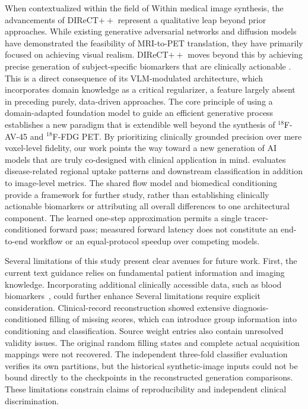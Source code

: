 \documentclass{article}
\providecommand{\DIFaddtex}[1]{{\protect\color{blue} \sf #1}} %
\providecommand{\DIFdeltex}[1]{{\protect\color{red} \scriptsize #1}} %
\providecommand{\DIFaddbegin}{} %
\providecommand{\DIFaddend}{} %
\providecommand{\DIFdelbegin}{} %
\providecommand{\DIFdelend}{} %
\providecommand{\DIFadd}[1]{\texorpdfstring{\DIFaddtex{#1}}{#1}} %
\providecommand{\DIFdel}[1]{\texorpdfstring{\DIFdeltex{#1}}{}} %
\newcommand{\DIFscaledelfig}{0.5}
\newlength{\DIFdelgraphicswidth} %
\newlength{\DIFdelgraphicsheight} %
\newcommand{\DIFaddincludegraphics}[2][]{{\color{blue}\fbox{\DIFOincludegraphics[#1]{#2}}}} %
\newcommand{\DIFdelincludegraphics}[2][]{%
\sbox{\DIFdelgraphicsbox}{\DIFOincludegraphics[#1]{#2}}%
\settoboxwidth{\DIFdelgraphicswidth}{\DIFdelgraphicsbox} %
\settoboxtotalheight{\DIFdelgraphicsheight}{\DIFdelgraphicsbox} %
\scalebox{\DIFscaledelfig}{%
\parbox[b]{\DIFdelgraphicswidth}{\usebox{\DIFdelgraphicsbox}\\[-\baselineskip] \rule{\DIFdelgraphicswidth}{0em}}\llap{\resizebox{\DIFdelgraphicswidth}{\DIFdelgraphicsheight}{%
\setlength{\unitlength}{\DIFdelgraphicswidth}%
\begin{picture}(1,1)%
\thicklines\linethickness{2pt} %
{\color[rgb]{1,0,0}\put(0,0){\framebox(1,1){}}}%
{\color[rgb]{1,0,0}\put(0,0){\line( 1,1){1}}}%
{\color[rgb]{1,0,0}\put(0,1){\line(1,-1){1}}}%
\end{picture}%
}\hspace*{3pt}}} %
} %
\DeclareRobustCommand{\DIFaddbegin}{\DIFOaddbegin \let\includegraphics\DIFaddincludegraphics} %
\DeclareRobustCommand{\DIFaddend}{\DIFOaddend \let\includegraphics\DIFOincludegraphics} %
\DeclareRobustCommand{\DIFdelbegin}{\DIFOdelbegin \let\includegraphics\DIFdelincludegraphics} %
\DeclareRobustCommand{\DIFdelend}{\DIFOaddend \let\includegraphics\DIFOincludegraphics} %
\begin{document}
\DIFdelbegin \DIFdel{When contextualized within the field of }\DIFdelend \DIFaddbegin \DIFadd{Within }\DIFaddend medical image synthesis, \DIFdelbegin \DIFdel{the advancements of }\DIFdelend DIReCT$++$ \DIFdelbegin \DIFdel{represent a qualitative leap beyond prior approaches. While existing generative adversarial networks and diffusion models have demonstrated the feasibility of MRI-to-PET translation, they have primarily focused on achieving visual realism. DIReCT$++$ moves beyond this by achieving precise generation of subject-specific biomarkers that are clinically actionable . This is a direct consequence of its VLM-modulated architecture, which incorporates domain knowledge as a critical regularizer, a feature largely absent in preceding purely, data-driven approaches. The core principle of using a domain-adapted foundation model to guide an efficient generative process establishes a new paradigm that is extendible well beyond the synthesis of $^{18}$F-AV-45 and $^{18}$F-FDG PET. By prioritizing clinically grounded precision over mere voxel-level fidelity, our work points the way toward a new generation of AI models that are truly co-designed with clinical application in mind. }\DIFdelend \DIFaddbegin \DIFadd{evaluates disease-related regional uptake patterns and downstream classification in addition to image-level metrics. The shared flow model and biomedical conditioning provide a framework for further study, rather than establishing clinically actionable biomarkers or attributing all overall differences to one architectural component. The learned one-step approximation permits a single tracer-conditioned forward pass; measured forward latency does not constitute an end-to-end workflow or an equal-protocol speedup over competing models.
}\DIFaddend 

\DIFdelbegin \DIFdel{Several limitations of this study present clear avenues for future work.
First, the current text guidance relies on fundamental patient information and imaging knowledge. Incorporating additional clinically accessible data, such as blood biomarkers~\cite{hansson2023blood}, could further enhance }\DIFdelend \DIFaddbegin \DIFadd{Several limitations require explicit consideration. Clinical-record reconstruction showed extensive diagnosis-conditioned filling of missing scores, which can introduce group information into conditioning and classification. Source weight entries also contain unresolved validity issues. The original random filling states and complete actual acquisition mappings were not recovered. The independent three-fold classifier evaluation verifies its own partitions, but the historical synthetic-image inputs could not be bound directly to the checkpoints in the reconstructed generation comparisons. These limitations constrain claims of reproducibility and independent clinical discrimination.
}
\end{document}
